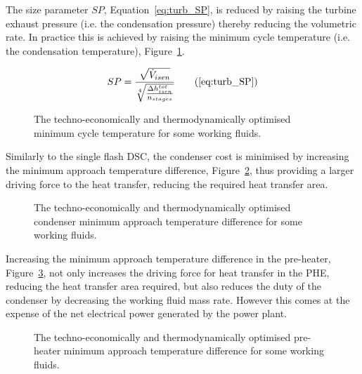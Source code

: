    The size parameter \(SP\), Equation~\ref{eq:turb_SP}, is reduced by raising the turbine exhaust pressure (i.e. the condensation pressure) thereby reducing the volumetric rate. In practice this is achieved by raising the minimum cycle temperature (i.e. the condensation temperature), Figure~\ref{fig:prosim_purewater_techno_op_Tmin}.

    \begin{align}
        SP = \frac{\sqrt{\Dot{V}_{isen}}}{\sqrt[4]{\frac{\Delta h_{isen}^{tot}}{n_{stages}}}} \tag{\ref{eq:turb_SP}}
    \end{align}

    \begin{figure}[H]
        \centering
        
        \caption{The techno-economically and thermodynamically optimised minimum cycle temperature for some working fluids.}
        \label{fig:prosim_purewater_techno_op_Tmin}
    \end{figure}

    Similarly to the single flash \ac{DSC}, the condenser cost is minimised by increasing the minimum approach temperature difference, Figure~\ref{fig:prosim_purewater_techno_op_DTpinchCond}, thus providing a larger driving force to the heat transfer, reducing the required heat transfer area.

    \begin{figure}[H]
        \centering
        
        \caption{The techno-economically and thermodynamically optimised condenser minimum approach temperature difference for some working fluids.}
        \label{fig:prosim_purewater_techno_op_DTpinchCond}
    \end{figure}

    Increasing the minimum approach temperature difference in the pre-heater, Figure~\ref{fig:prosim_purewater_techno_op_DTpinchPreH}, not only increases the driving force for heat transfer in the \ac{PHE}, reducing the heat transfer area required, but also reduces the duty of the condenser by decreasing the working fluid mass rate. However this comes at the expense of the net electrical power generated by the power plant.   

    \begin{figure}[H]
        \centering
        
        \caption{The techno-economically and thermodynamically optimised pre-heater minimum approach temperature difference for some working fluids.}
        \label{fig:prosim_purewater_techno_op_DTpinchPreH}
    \end{figure}

